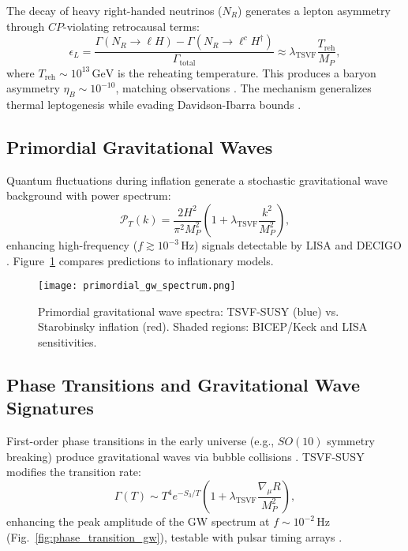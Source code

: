 \documentclass[twocolumn,superscriptaddress,floatfix]{revtex4-2}
\begin{document}
The decay of heavy right-handed neutrinos (\(N_R\)) generates a lepton asymmetry through \(CP\)-violating retrocausal terms:  
\begin{equation}  
\epsilon_L = \frac{\Gamma(N_R \to \ell H) - \Gamma(N_R \to \ell^c H^\dagger)}{\Gamma_{\text{total}}} \approx \lambda_{\text{TSVF}} \frac{T_{\text{reh}}}{M_P},  
\label{eq:leptogenesis}  
\end{equation}  
where \(T_{\text{reh}} \sim 10^{13} \, \text{GeV}\) is the reheating temperature. This produces a baryon asymmetry \(\eta_B \sim 10^{-10}\), matching observations \cite{Planck2018}. The mechanism generalizes thermal leptogenesis \cite{Fukugita1986} while evading Davidson-Ibarra bounds \cite{Davidson2002}.  

\subsection{Primordial Gravitational Waves}  
\label{subsec:primordial_gw}  

Quantum fluctuations during inflation generate a stochastic gravitational wave background with power spectrum:  
\begin{equation}  
\mathcal{P}_T(k) = \frac{2H^2}{\pi^2 M_P^2} \left(1 + \lambda_{\text{TSVF}} \frac{k^2}{M_P^2}\right),  
\label{eq:gw_power}  
\end{equation}  
enhancing high-frequency (\(f \gtrsim 10^{-3} \, \text{Hz}\)) signals detectable by LISA \cite{Amaro-Seoane2017} and DECIGO \cite{Kawamura2020}. Figure~\ref{fig:primordial_gw} compares predictions to inflationary models.  

\begin{figure}[htbp]  
\centering  
\texttt{[image: primordial\_gw\_spectrum.png]}  
\caption{Primordial gravitational wave spectra: TSVF-SUSY (blue) vs. Starobinsky inflation (red). Shaded regions: BICEP/Keck \cite{BICEP2021} and LISA sensitivities.}  
\label{fig:primordial_gw}  
\end{figure}  

\subsection{Phase Transitions and Gravitational Wave Signatures}  
\label{subsec:phase_transitions}  

First-order phase transitions in the early universe (e.g., \(SO(10)\) symmetry breaking) produce gravitational waves via bubble collisions \cite{Kosowsky1992}. TSVF-SUSY modifies the transition rate:  
\begin{equation}  
\Gamma(T) \sim T^4 e^{-S_3/T} \left(1 + \lambda_{\text{TSVF}} \frac{\nabla_\mu R}{M_P^2}\right),  
\label{eq:phase_transition}  
\end{equation}  
enhancing the peak amplitude of the GW spectrum at \(f \sim 10^{-2} \, \text{Hz}\) (Fig.~\ref{fig:phase_transition_gw}), testable with pulsar timing arrays \cite{IPTA2021}.  
\end{document}
